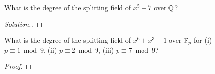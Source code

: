 \begin{que} %
What is the degree of the splitting field of $x^5 - 7$ over $\mathbb{Q}$?
\end{que}
\begin{proof}[Solution.]

\end{proof}

\begin{que} %
What is the degree of the splitting field of $x^6 + x^3 + 1$ over $\mathbb{F}_p$ for (i) $p \equiv 1 \bmod 9$, (ii) $p \equiv 2 \bmod 9$, (iii) $p \equiv 7 \bmod 9$?
\end{que}
\begin{proof}

\end{proof}